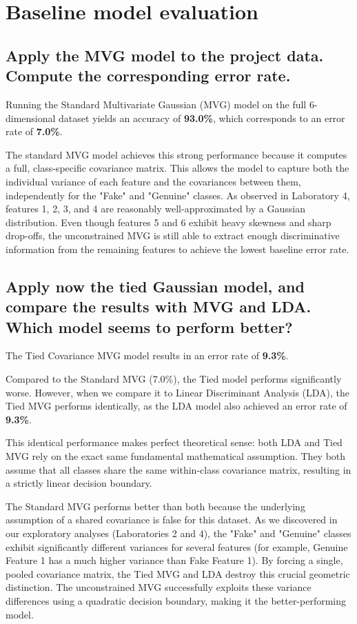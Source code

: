 \section{Baseline model evaluation}

\subsection*{Apply the MVG model to the project data. Compute the corresponding error rate.}
Running the Standard Multivariate Gaussian (MVG) model on the full 6-dimensional dataset yields an accuracy of \textbf{93.0\%}, which corresponds to an error rate of \textbf{7.0\%}. 

The standard MVG model achieves this strong performance because it computes a full, class-specific covariance matrix. This allows the model to capture both the individual variance of each feature and the covariances between them, independently for the "Fake" and "Genuine" classes. As observed in Laboratory 4, features 1, 2, 3, and 4 are reasonably well-approximated by a Gaussian distribution. Even though features 5 and 6 exhibit heavy skewness and sharp drop-offs, the unconstrained MVG is still able to extract enough discriminative information from the remaining features to achieve the lowest baseline error rate.

\subsection*{Apply now the tied Gaussian model, and compare the results with MVG and LDA. Which model seems to perform better?}
The Tied Covariance MVG model results in an error rate of \textbf{9.3\%}. 

Compared to the Standard MVG (7.0\%), the Tied model performs significantly worse. However, when we compare it to Linear Discriminant Analysis (LDA), the Tied MVG performs identically, as the LDA model also achieved an error rate of \textbf{9.3\%}. 

This identical performance makes perfect theoretical sense: both LDA and Tied MVG rely on the exact same fundamental mathematical assumption. They both assume that all classes share the same within-class covariance matrix, resulting in a strictly linear decision boundary. 

The Standard MVG performs better than both because the underlying assumption of a shared covariance is false for this dataset. As we discovered in our exploratory analyses (Laboratories 2 and 4), the "Fake" and "Genuine" classes exhibit significantly different variances for several features (for example, Genuine Feature 1 has a much higher variance than Fake Feature 1). By forcing a single, pooled covariance matrix, the Tied MVG and LDA destroy this crucial geometric distinction. The unconstrained MVG successfully exploits these variance differences using a quadratic decision boundary, making it the better-performing model.


